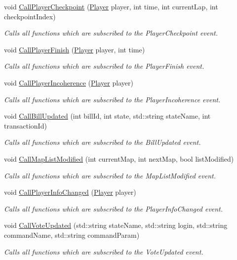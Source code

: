 \begin{DoxyCompactItemize}
void \hyperlink{classEventManager_a8a3c5f621c44b15c560110ab2b25a51f}{Call\-Player\-Checkpoint} (\hyperlink{structPlayer}{Player} player, int time, int current\-Lap, int checkpoint\-Index)
\begin{DoxyCompactList}\small\item\em Calls all functions which are subscribed to the Player\-Checkpoint event. \end{DoxyCompactList}\item 
void \hyperlink{classEventManager_afb2a6208c30bc3c1b4a85e39a8f9a9f4}{Call\-Player\-Finish} (\hyperlink{structPlayer}{Player} player, int time)
\begin{DoxyCompactList}\small\item\em Calls all functions which are subscribed to the Player\-Finish event. \end{DoxyCompactList}\item 
void \hyperlink{classEventManager_afdd5ead369a6440a6419e0d5269af5bc}{Call\-Player\-Incoherence} (\hyperlink{structPlayer}{Player} player)
\begin{DoxyCompactList}\small\item\em Calls all functions which are subscribed to the Player\-Incoherence event. \end{DoxyCompactList}\item 
void \hyperlink{classEventManager_aee53ab1e28714b9cbcd381b23efae623}{Call\-Bill\-Updated} (int bill\-Id, int state, std\-::string state\-Name, int transaction\-Id)
\begin{DoxyCompactList}\small\item\em Calls all functions which are subscribed to the Bill\-Updated event. \end{DoxyCompactList}\item 
void \hyperlink{classEventManager_a992d53782e7aacc561ff5348f7905b1b}{Call\-Map\-List\-Modified} (int current\-Map, int next\-Map, bool list\-Modified)
\begin{DoxyCompactList}\small\item\em Calls all functions which are subscribed to the Map\-List\-Modified event. \end{DoxyCompactList}\item 
void \hyperlink{classEventManager_a1673fa8c0a40a910cb3ed800e1a2fc11}{Call\-Player\-Info\-Changed} (\hyperlink{structPlayer}{Player} player)
\begin{DoxyCompactList}\small\item\em Calls all functions which are subscribed to the Player\-Info\-Changed event. \end{DoxyCompactList}\item 
void \hyperlink{classEventManager_ad9907c7d0fd7a93e336e4a99db008540}{Call\-Vote\-Updated} (std\-::string state\-Name, std\-::string login, std\-::string command\-Name, std\-::string command\-Param)
\begin{DoxyCompactList}\small\item\em Calls all functions which are subscribed to the Vote\-Updated event. \end{DoxyCompactList}\end{DoxyCompactItemize}
